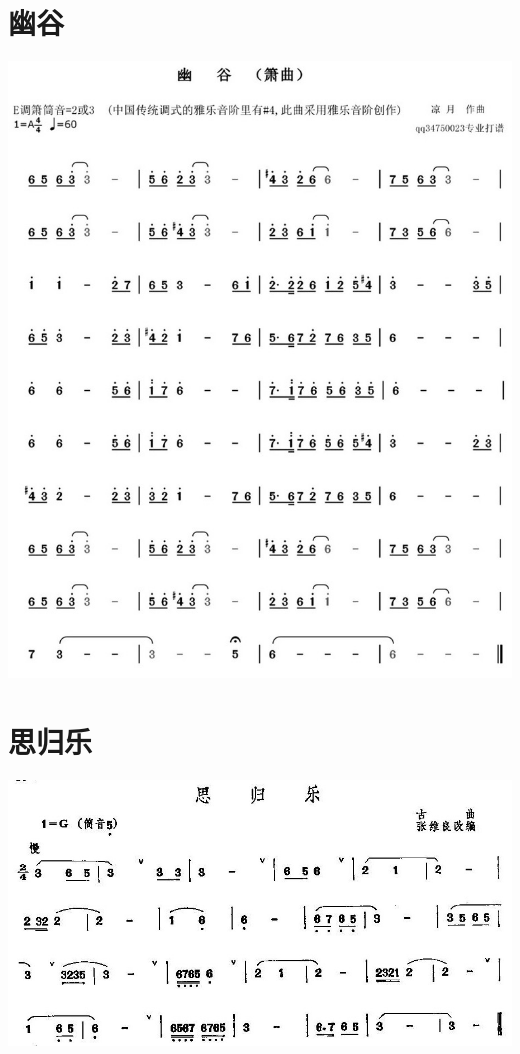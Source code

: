 \documentclass[cn,pad,twocol]{elegantbook}
\begin{document}
\section{幽谷}\includegraphics[width=\textwidth]{dongxiao/20200819/幽谷.jpeg}
\section{思归乐}\includegraphics[width=\textwidth]{dongxiao/20200819/思归乐.jpeg}
\end{document}

